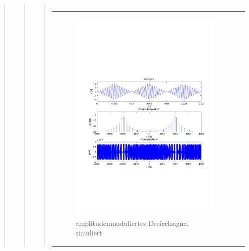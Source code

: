 \begin{quote}
\begin{quote}
\begin{quote}
\begin{center}
\begin{tabular}{ll}
                \end{tabular}
                \end{center}
                
                        \begin{center}
                \begin{tabular}{ll}
    
                \hspace{-10em}
                    \begin{minipage}{0.6\textwidth}
    
                        \begin{figure}[H]
                            \label{fig:}
                            \includegraphics[scale=0.4, trim = 2cm 6.5cm 1.5cm
                            8.5cm, clip]{./Bilder/Dreieckmodsimuliert} %
                            \caption{amplitudenmoduliertes Dreiecksignal simuliert}
                        \end{figure}
    

\end{minipage}
\end{tabular}
\end{center}
\end{quote}
\end{quote}
\end{quote}
